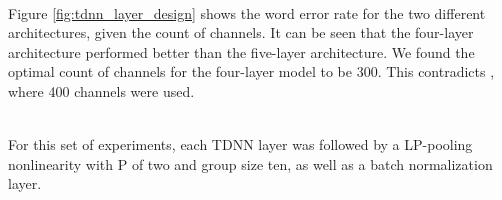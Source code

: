 \\
Figure \ref{fig:tdnn_layer_design} shows the word error rate for the two different architectures, given the count of channels. It can be seen that the four-layer architecture performed better than the five-layer architecture. We found the optimal count of channels  for the four-layer model to be 300. This contradicts \cite{peddinti2015reverberation}, where 400 channels were used. \\ \\
\begin{minipage}{\linewidth}
	\label{fig:tdnn_layer_design}
\end{minipage} 
For this set of experiments, each TDNN layer was followed by a LP-pooling nonlinearity with P of two and group size ten, as well as a batch normalization layer.
